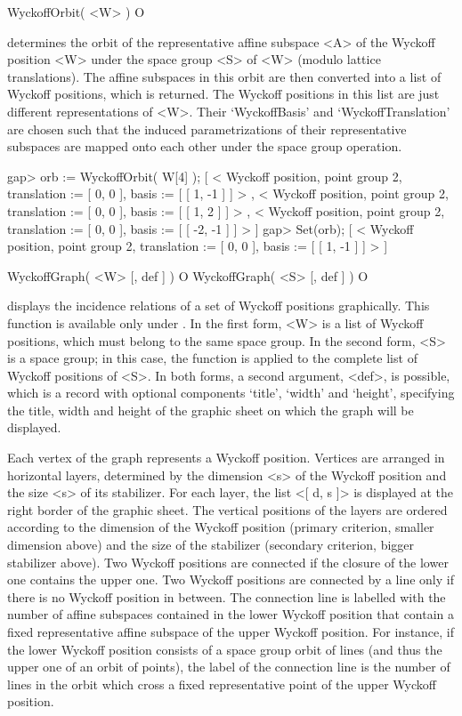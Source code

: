 \>WyckoffOrbit( <W> ) O

determines the orbit of the representative affine subspace <A> of the 
Wyckoff position <W> under the space group <S> of <W> (modulo lattice 
translations). The affine subspaces in this orbit are then converted 
into a list of Wyckoff positions, which is returned. The Wyckoff 
positions in this list are just different representations of <W>. 
Their `WyckoffBasis' and `WyckoffTranslation' are chosen such that 
the induced parametrizations of their representative subspaces are 
mapped onto each other under the space group operation.

\beginexample
gap> orb := WyckoffOrbit( W[4] );
[ < Wyckoff position, point group 2, translation := [ 0, 0 ], 
    basis := [ [ 1, -1 ] ] >
    , < Wyckoff position, point group 2, translation := [ 0, 0 ], 
    basis := [ [ 1, 2 ] ] >
    , < Wyckoff position, point group 2, translation := [ 0, 0 ], 
    basis := [ [ -2, -1 ] ] >
     ]
gap> Set(orb);
[ < Wyckoff position, point group 2, translation := [ 0, 0 ], 
    basis := [ [ 1, -1 ] ] >
     ]
\endexample

\>WyckoffGraph( <W> [, def ] ) O
\>WyckoffGraph( <S> [, def ] ) O

displays the incidence relations of a set of Wyckoff positions graphically.
This function is available only under {\XGAP}. In the first form, <W> is
a list of Wyckoff positions, which must belong to the same space group.
In the second form, <S> is a space group; in this case, the function is
applied to the complete list of Wyckoff positions of <S>. In both forms,
a second argument, <def>, is possible, which is a record with optional
components `title', `width' and `height', specifying the title, width
and height of the graphic sheet on which the graph will be displayed.

Each vertex of the graph represents a Wyckoff position. Vertices are
arranged in horizontal layers, determined by the dimension <s> of the 
Wyckoff position and the size <s> of its stabilizer. For each layer, 
the list <[ d, s ]> is displayed at the right border of the graphic 
sheet. The vertical positions of the layers are ordered according to 
the dimension of the Wyckoff position (primary criterion, smaller 
dimension above) and the size of the stabilizer (secondary criterion, 
bigger stabilizer above). Two Wyckoff positions are connected if the 
closure of the lower one contains the upper one. Two Wyckoff positions
are connected by a line only if there is no Wyckoff position in between. 
The connection line is labelled with the number of affine subspaces 
contained in the lower Wyckoff position that contain a fixed 
representative affine subspace of the upper Wyckoff position.
For instance, if the lower Wyckoff position consists of a space
group orbit of lines (and thus the upper one of an orbit of points), 
the label of the connection line is the number of lines in the orbit 
which cross a fixed representative point of the upper Wyckoff position.

